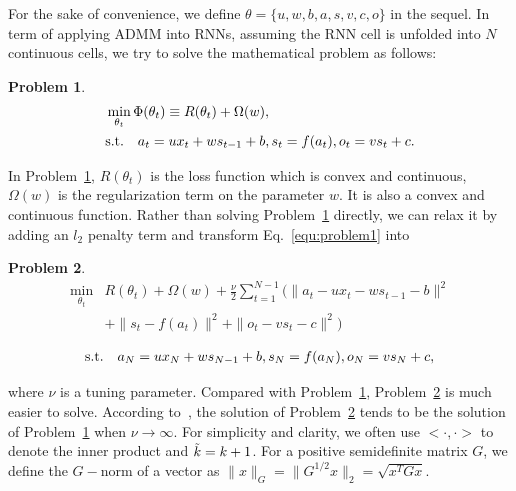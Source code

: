 \documentclass[twoside]{article}
\newtheorem{problem}{Problem}
\begin{document}
\begin{multicols}{2}
For the sake of convenience, we define $\theta=\{u,w,b,a,s,v,c,o\}$ in the sequel. 
In term of applying ADMM into RNNs, assuming the RNN cell is unfolded into $N$ continuous cells, we try to solve the mathematical problem as follows:
\begin{problem}\label{problem:1}
\begin{equation}\label{equ:problem1}
\begin{aligned}
    & \min\limits_{\theta_t} \Phi(\theta_t) \equiv R(\theta_t) + \Omega(w) ,   \\
    & {\rm{s.t.}} \quad a_t = ux_t + ws_{t-1} + b, s_t = f(a_t), o_t = vs_t + c.
\end{aligned}
\end{equation}
\end{problem}
In Problem~\ref{problem:1}, $R(\theta_t)$ is the loss function which is convex and continuous, $\Omega(w)$ is the regularization term on the parameter $w$.
It is also a convex and continuous function.
Rather than solving Problem~\ref{problem:1} directly, we can relax it by adding an $l_2$ penalty term and transform Eq.~\eqref{equ:problem1} into 
\begin{problem}\label{problem:2}
\begin{equation}\label{equ:problem2}
    \begin{aligned}
        \min\limits_{\theta_t} & R(\theta_t) + \Omega(w) + \frac{\nu}{2}\sum_{t=1}^{N-1}(\|a_t-ux_t-ws_{t-1}-b\|^2   \\
        & + \|s_t-f(a_t)\|^2 + \|o_t-vs_t-c\|^2)  \\
    \end{aligned}
\end{equation}
\begin{equation}\nonumber
    \begin{aligned}
        {\rm{s.t.}} \quad a_N = ux_N + ws_{N-1} + b, s_N = f(a_N), o_N = vs_N + c,
    \end{aligned}    
\end{equation}
\end{problem}
where $\nu$ is a tuning parameter.
Compared with Problem~\ref{problem:1}, Problem~\ref{problem:2} is much easier to solve.
According to~\cite{wang2019admm}, the solution of Problem~\ref{problem:2} tends to be the solution of Problem~\ref{problem:1} when $\nu \rightarrow \infty$.
For simplicity and clarity, we often use $<\cdot,\cdot>$ to denote the inner product and $\Tilde{k} = k+1$.
For a positive semidefinite matrix $G$, we define the $G-$norm of a vector as $\|x\|_G=\|G^{1/2}x\|_2=\sqrt{x^TGx}$.


\end{multicols}
\end{document}
